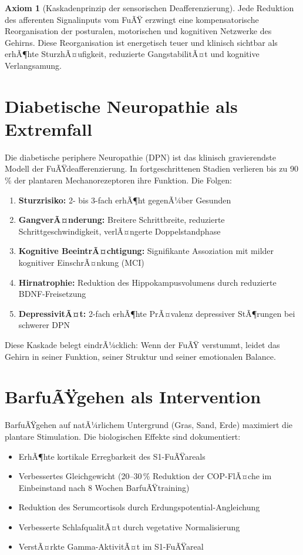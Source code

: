 ﻿\documentclass[12pt,a4paper]{report}
\theoremstyle{plain}
\theoremstyle{definition}
\newtheorem{axiom}[theorem]{Axiom}
\theoremstyle{remark}
\begin{document}
\begin{axiom}[Kaskadenprinzip der sensorischen Deafferenzierung]
Jede Reduktion des afferenten Signalinputs vom FuÃŸ erzwingt eine
kompensatorische Reorganisation der posturalen, motorischen und
kognitiven Netzwerke des Gehirns. Diese Reorganisation ist energetisch
teuer und klinisch sichtbar als erhÃ¶hte SturzhÃ¤ufigkeit, reduzierte
GangstabilitÃ¤t und kognitive Verlangsamung.
\end{axiom}

\section{Diabetische Neuropathie als Extremfall}

Die diabetische periphere Neuropathie (DPN) ist das klinisch gravierendste
Modell der FuÃŸdeafferenzierung. In fortgeschrittenen Stadien verlieren
bis zu 90\,\% der plantaren Mechanorezeptoren ihre Funktion. Die Folgen:

\begin{enumerate}
\item \textbf{Sturzrisiko:} 2- bis 3-fach erhÃ¶ht gegenÃ¼ber Gesunden
  \cite{richardson2004}
\item \textbf{GangverÃ¤nderung:} Breitere Schrittbreite, reduzierte
  Schrittgeschwindigkeit, verlÃ¤ngerte Doppelstandphase
\item \textbf{Kognitive BeeintrÃ¤chtigung:} Signifikante Assoziation
  mit milder kognitiver EinschrÃ¤nkung (MCI) \cite{strachan2001}
\item \textbf{Hirnatrophie:} Reduktion des Hippokampusvolumens durch
  reduzierte BDNF-Freisetzung
\item \textbf{DepressivitÃ¤t:} 2-fach erhÃ¶hte PrÃ¤valenz depressiver
  StÃ¶rungen bei schwerer DPN \cite{veglio2005}
\end{enumerate}

Diese Kaskade belegt eindrÃ¼cklich: Wenn der FuÃŸ verstummt, leidet das
Gehirn in seiner Funktion, seiner Struktur und seiner emotionalen Balance.

\section{BarfuÃŸgehen als Intervention}

BarfuÃŸgehen auf natÃ¼rlichem Untergrund (Gras, Sand, Erde) maximiert die
plantare Stimulation. Die biologischen Effekte sind dokumentiert:

\begin{itemize}
\item ErhÃ¶hte kortikale Erregbarkeit des S1-FuÃŸareals \cite{catani2005}
\item Verbessertes Gleichgewicht (20--30\,\% Reduktion der COP-FlÃ¤che
  im Einbeinstand nach 8 Wochen BarfuÃŸtraining)
\item Reduktion des Serumcortisols durch Erdungspotential-Angleichung
  \cite{chevalier2012}
\item Verbesserte SchlafqualitÃ¤t durch vegetative Normalisierung
\item VerstÃ¤rkte Gamma-AktivitÃ¤t im S1-FuÃŸareal
\end{itemize}
\end{document}
